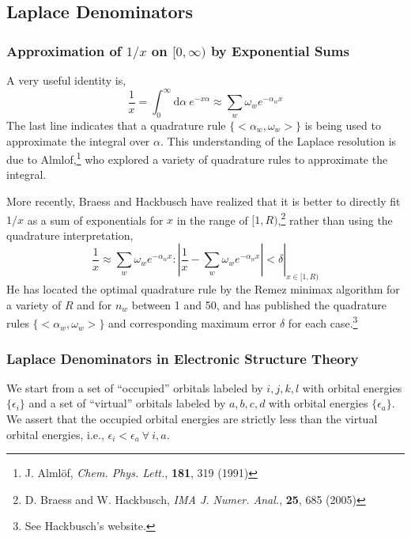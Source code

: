 \documentclass[fleqn,oneside,12pt]{article}
\date{}
\begin{document}

\subsection{Laplace Denominators}

\subsubsection{Approximation of $1/x$ on $[0, \infty)$ by Exponential Sums}

A very useful identity is,
\[
\frac{1}{x}
=
\int_{0}^{\infty}
\mathrm{d} \alpha \
e^{-x \alpha}
\approx
\sum_{w}
\omega_{w}
e^{-\alpha_{w} x}
\]
The last line indicates that a quadrature rule $\{ <\alpha_{w}, \omega_{w} > \}$
is being used to approximate the integral over $\alpha$. This understanding of
the Laplace resolution is due to Almlof,\footnote{J. Alml\"of, \emph{Chem. Phys.
Lett.}, \textbf{181}, 319 (1991)} who explored a variety of quadrature rules to
approximate the integral. 

More recently, Braess and Hackbusch have realized that it is better to directly
fit $1/x$ as a sum of exponentials for $x$ in the range of $[1, R)$,\footnote{D.
Braess and W. Hackbusch, \emph{IMA J. Numer. Anal.}, \textbf{25}, 685 (2005)}
rather than using the quadrature interpretation,
\[
\frac{1}{x}
\approx
\sum_{w}
\omega_{w}
e^{-\alpha_{w} x}
:
\left .
\left |
\frac{1}{x}
-
\sum_{w}
\omega_{w}
e^{-\alpha_{w} x}
\right |
<
\delta
\right |_{x \in [1, R)}
\]
He has located the optimal quadrature rule by the Remez minimax algorithm for a
variety of $R$ and for $n_{w}$ between 1 and 50, and has published the
quadrature rules $\{ < \alpha_{w}, \omega_{w} > \}$ and corresponding maximum
error $\delta$ for each case.\footnote{See Hackbusch's website.}

\subsubsection{Laplace Denominators in Electronic Structure Theory}

We start from a set of ``occupied'' orbitals labeled by $i,j,k,l$ with orbital
energies $\{ \epsilon_{i} \}$ and a set of ``virtual'' orbitals labeled by
$a,b,c,d$ with orbital energies $\{ \epsilon_{a} \}$. We assert that the
occupied orbital energies are strictly less than the virtual orbital energies,
i.e., $\epsilon_{i} < \epsilon_{a} \ \forall \ i,a$.
\end{document}
